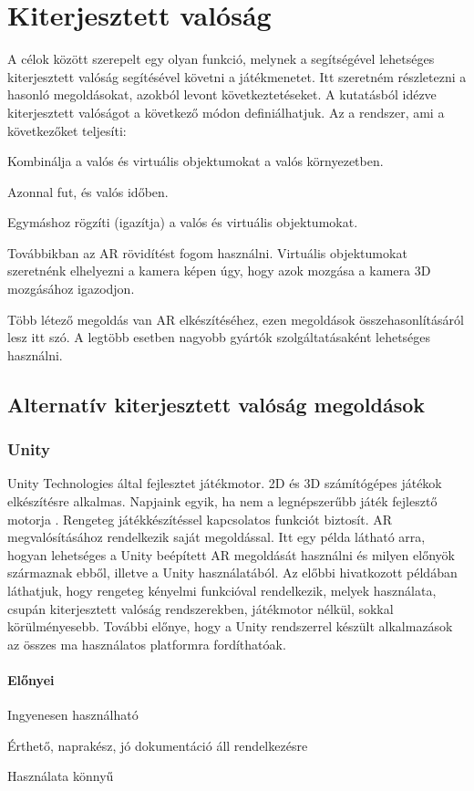 \documentclass[12pt,a4paper,oneside]{report} %
\begin{document}
\section{Kiterjesztett valóság}
\label{kitvalo}
A célok között szerepelt egy olyan funkció, melynek a segítségével lehetséges kiterjesztett valóság segítésével követni a játékmenetet. Itt szeretném részletezni a hasonló megoldásokat, azokból levont következtetéseket.
A \cite{azuma2001recent} kutatásból idézve  kiterjesztett valóságot a következő módon definiálhatjuk. Az a rendszer, ami a következőket teljesíti:
\begin{compactitem}
	\item Kombinálja a valós és virtuális objektumokat a valós környezetben.
	\item Azonnal fut, és valós időben.
	\item Egymáshoz rögzíti (igazítja) a valós és virtuális objektumokat.
\end{compactitem}
Továbbikban az AR rövidítést fogom használni. 
Virtuális objektumokat szeretnénk elhelyezni a kamera képen úgy, hogy azok mozgása a kamera 3D mozgásához igazodjon. 
\par Több létező megoldás van AR elkészítéséhez, ezen megoldások összehasonlításáról lesz itt szó.
A legtöbb esetben nagyobb gyártók szolgáltatásaként lehetséges használni.
\subsection{Alternatív kiterjesztett valóság megoldások}
\label{kitval}
\subsubsection{Unity}
Unity Technologies által fejlesztet játékmotor. 2D és 3D számítógépes játékok elkészítésre alkalmas. Napjaink egyik, ha nem a legnépszerűbb játék fejlesztő motorja \cite{haas2014history}.
Rengeteg játékkészítéssel kapcsolatos funkciót biztosít. AR megvalósításához rendelkezik saját megoldással. Itt \cite{kim2014using} egy példa látható arra, hogyan lehetséges a Unity beépített AR megoldását használni és milyen előnyök származnak ebből, illetve a Unity használatából. Az előbbi hivatkozott példában láthatjuk, hogy rengeteg kényelmi funkcióval rendelkezik, melyek használata, csupán kiterjesztett valóság rendszerekben, játékmotor nélkül, sokkal körülményesebb.  További előnye, hogy a Unity rendszerrel készült alkalmazások az összes ma használatos platformra fordíthatóak. 
\paragraph{Előnyei} 
\begin{compactitem}
	\item Ingyenesen használható
	\item Érthető, naprakész, jó dokumentáció áll rendelkezésre
	\item Használata könnyű
\end{compactitem}
\end{document}
